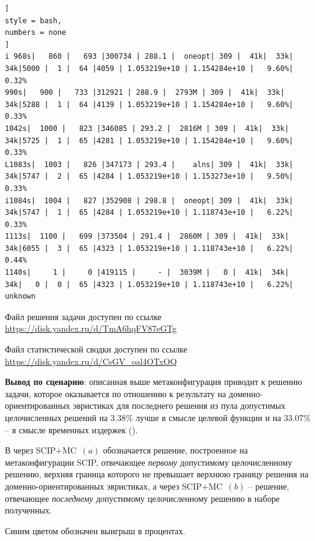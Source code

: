 \documentclass[%
	11pt,
	a4paper,
	utf8,
		]{article}
\begin{document}
\begin{lstlisting}[
style = bash,
numbers = none
]
i 968s|   860 |   693 |300734 | 288.1 |  oneopt| 309 |  41k|  33k|  34k|5000 |  1 |  64 |4059 | 1.053219e+10 | 1.154284e+10 |   9.60%|   0.32%
990s|   900 |   733 |312921 | 288.9 |  2793M | 309 |  41k|  33k|  34k|5288 |  1 |  64 |4139 | 1.053219e+10 | 1.154284e+10 |   9.60%|   0.33%
1042s|  1000 |   823 |346085 | 293.2 |  2816M | 309 |  41k|  33k|  34k|5725 |  1 |  65 |4281 | 1.053219e+10 | 1.154284e+10 |   9.60%|   0.33%
L1083s|  1003 |   826 |347173 | 293.4 |    alns| 309 |  41k|  33k|  34k|5747 |  2 |  65 |4284 | 1.053219e+10 | 1.153273e+10 |   9.50%|   0.33%
i1084s|  1004 |   827 |352908 | 298.8 |  oneopt| 309 |  41k|  33k|  34k|5747 |  1 |  65 |4284 | 1.053219e+10 | 1.118743e+10 |   6.22%|   0.33%
1113s|  1100 |   699 |373504 | 291.4 |  2860M | 309 |  41k|  33k|  34k|6055 |  3 |  65 |4323 | 1.053219e+10 | 1.118743e+10 |   6.22%|   0.44%
1140s|     1 |     0 |419115 |     - |  3039M |   0 |  41k|  34k|  34k|   0 |  0 |  65 |4323 | 1.053219e+10 | 1.118743e+10 |   6.22%| unknown
\end{lstlisting}

Файл решения задачи доступен по ссылке \url{https://disk.yandex.ru/d/TmA6hqFV87eGTg}

Файл статистической сводки доступен по ссылке \url{https://disk.yandex.ru/d/CsGV_oal4OTxOQ}

\vspace*{3mm}
\textbf{Вывод по сценарию}: описанная выше метаконфигурация приводит к решению задачи, которое оказывается по отношению к результату на доменно-ориентированных эвристиках для последнего решения из пула допустимых целочисленных решений на 3.38\% лучше в смысле целевой функции и на 33.07\% -- в смысле временных издержек ().

В   через SCIP+MC~$ (a) $ обозначается решение, построенное на метаконфигурации SCIP, отвечающее \emph{первому} допустимому целочисленному решению, верхняя граница которого не превышает верхнюю границу решения на доменно-ориентированных эвристиках, а через SCIP+MC~$ (b) $ -- решение, отвечающее \emph{последнему} допустимому целочисленному решению в наборе полученных.

Синим цветом обозначен выигрыш в процентах.
\end{document}
